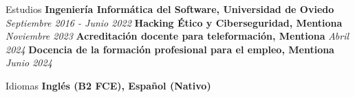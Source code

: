 \documentclass{resume} %
\begin{document}




\pagestyle{fancy}

\def\headrulewidth{0pt}
\setlength{\ruleheight}{\textheight}
\addtolength{\ruleheight}{20mm}
\fancyhead{}
\fancyfoot{}
\fancyfoot[C]{\footnotesize\thepage}





\begin{rSection}{Estudios}
{\bf Ingeniería Informática del Software, Universidad de Oviedo} {\em Septiembre 2016 - Junio 2022}\newline
{\bf Hacking Ético y Ciberseguridad, Mentiona} {\em Noviembre 2023} \newline
{\bf Acreditación docente para teleformación, Mentiona} {\em Abril 2024} \newline
{\bf Docencia de la formación profesional para el empleo, Mentiona} {\em Junio 2024}

 
 

\end{rSection}
\begin{rSection}{Idiomas}
{\bf Inglés (B2 FCE), Español (Nativo)}
\end{rSection}
\end{document}
